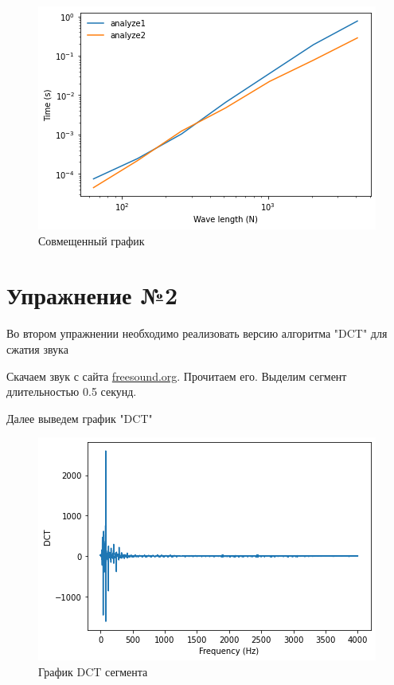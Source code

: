 \documentclass[a4paper, 14pt]{extarticle}
\begin{document}
    \begin{figure}[H]
        \centering
        \includegraphics[width=0.8\linewidth]{analyze_1_2_wave}
        \caption{Совмещенный график}
        \label{fig:analyze_1_2_wave}
    \end{figure}


    \newpage


    \section{Упражнение №2}
    \label{sec:2}

    Во втором упражнении необходимо реализовать версию алгоритма "DCT" для сжатия звука

    Скачаем звук с сайта \href{https://freesound.org}{freesound.org}.
    Прочитаем его.
    Выделим сегмент длительностью 0.5 секунд.

    Далее выведем график "DCT"

    \begin{figure}[H]
        \centering
        \includegraphics[width=0.8\linewidth]{bass_dct}
        \caption{График DCT сегмента}
        \label{fig:bass_dct}
    \end{figure}
\end{document}
